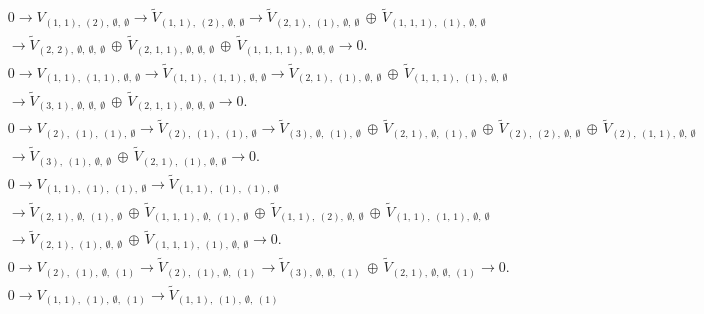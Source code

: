 \documentclass[openany, a4paper]{amsbook}
\theoremstyle{definition}
\numberwithin{equation}{chapter}
\begin{document}
\begin{align*}
\\ &
0 \to 
V_{ (1,\,1), \ (2), \ \emptyset, \ \emptyset }\to
\tilde{V}_{ (1,\,1), \ (2), \ \emptyset, \ \emptyset }
\to
\tilde{V}_{ (2,\,1), \ (1), \ \emptyset, \ \emptyset }\,\oplus\,\tilde{V}_{ (1,\,1,\,1), \ (1), \ \emptyset, \ \emptyset } \\ &
\to
\tilde{V}_{ (2,\,2), \ \emptyset, \ \emptyset, \ \emptyset }\,\oplus\,\tilde{V}_{ (2,\,1,\,1), \ \emptyset, \ \emptyset, \ \emptyset }\,\oplus\,\tilde{V}_{ (1,\,1,\,1,\,1), \ \emptyset, \ \emptyset, \ \emptyset }
\to 0.
\\ &
0 \to 
V_{ (1,\,1), \ (1,\,1), \ \emptyset, \ \emptyset }\to
\tilde{V}_{ (1,\,1), \ (1,\,1), \ \emptyset, \ \emptyset }
\to
\tilde{V}_{ (2,\,1), \ (1), \ \emptyset, \ \emptyset }\,\oplus\,\tilde{V}_{ (1,\,1,\,1), \ (1), \ \emptyset, \ \emptyset } \\ &
\to
\tilde{V}_{ (3,\,1), \ \emptyset, \ \emptyset, \ \emptyset }\,\oplus\,\tilde{V}_{ (2,\,1,\,1), \ \emptyset, \ \emptyset, \ \emptyset }
\to 0.
\\ &
0 \to 
V_{ (2), \ (1), \ (1), \ \emptyset }\to
\tilde{V}_{ (2), \ (1), \ (1), \ \emptyset }
\to
\tilde{V}_{ (3), \ \emptyset, \ (1), \ \emptyset }\,\oplus\,\tilde{V}_{ (2,\,1), \ \emptyset, \ (1), \ \emptyset }\,\oplus\,\tilde{V}_{ (2), \ (2), \ \emptyset, \ \emptyset }\,\oplus\,\tilde{V}_{ (2), \ (1,\,1), \ \emptyset, \ \emptyset } \\ &
\to
\tilde{V}_{ (3), \ (1), \ \emptyset, \ \emptyset }\,\oplus\,\tilde{V}_{ (2,\,1), \ (1), \ \emptyset, \ \emptyset }
\to 0.
\\ &
0 \to 
V_{ (1,\,1), \ (1), \ (1), \ \emptyset }\to
\tilde{V}_{ (1,\,1), \ (1), \ (1), \ \emptyset }
\\ &
\to
\tilde{V}_{ (2,\,1), \ \emptyset, \ (1), \ \emptyset }\,\oplus\,\tilde{V}_{ (1,\,1,\,1), \ \emptyset, \ (1), \ \emptyset }\,\oplus\,\tilde{V}_{ (1,\,1), \ (2), \ \emptyset, \ \emptyset }\,\oplus\,\tilde{V}_{ (1,\,1), \ (1,\,1), \ \emptyset, \ \emptyset } \\ &
\to
\tilde{V}_{ (2,\,1), \ (1), \ \emptyset, \ \emptyset }\,\oplus\,\tilde{V}_{ (1,\,1,\,1), \ (1), \ \emptyset, \ \emptyset }
\to 0.
\\ &
0 \to 
V_{ (2), \ (1), \ \emptyset, \ (1) }\to
\tilde{V}_{ (2), \ (1), \ \emptyset, \ (1) }
\to
\tilde{V}_{ (3), \ \emptyset, \ \emptyset, \ (1) }\,\oplus\,\tilde{V}_{ (2,\,1), \ \emptyset, \ \emptyset, \ (1) }
\to 0.
\\ &
0 \to 
V_{ (1,\,1), \ (1), \ \emptyset, \ (1) }\to
\tilde{V}_{ (1,\,1), \ (1), \ \emptyset, \ (1) }

\end{align*}
\end{document}
